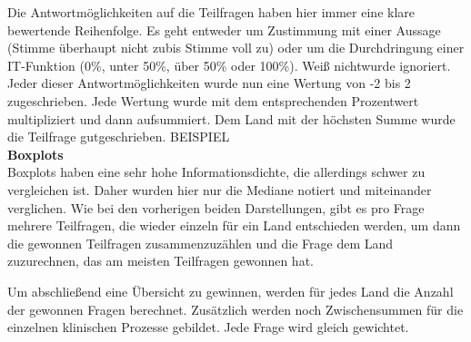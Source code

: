 	Die Antwortmöglichkeiten auf die Teilfragen haben hier immer eine klare bewertende Reihenfolge. Es geht entweder um Zustimmung mit einer Aussage (\glqq Stimme überhaupt nicht zu\grqq{ }bis \glqq Stimme voll zu\grqq) oder um die Durchdringung einer IT-Funktion (0\%, unter 50\%, über 50\% oder 100\%). \glqq Weiß nicht\grqq{ }wurde ignoriert. Jeder dieser Antwortmöglichkeiten wurde nun eine Wertung von -2 bis 2 zugeschrieben. Jede Wertung wurde mit dem entsprechenden Prozentwert multipliziert und dann aufsummiert. Dem Land mit der höchsten Summe wurde die Teilfrage gutgeschrieben.
	BEISPIEL
	\vspace{1ex}\\
	\textbf{Boxplots}\\
	Boxplots haben eine sehr hohe Informationsdichte, die allerdings schwer zu vergleichen ist. Daher wurden hier nur die Mediane notiert und miteinander verglichen. Wie bei den vorherigen beiden Darstellungen, gibt es pro Frage mehrere Teilfragen, die wieder einzeln für ein Land entschieden werden, um dann die gewonnen Teilfragen zusammenzuzählen und die Frage dem Land zuzurechnen, das am meisten Teilfragen gewonnen hat.

	Um abschließend eine Übersicht zu gewinnen, werden für jedes Land die Anzahl der gewonnen Fragen berechnet. Zusätzlich werden noch Zwischensummen für die einzelnen klinischen Prozesse gebildet. Jede Frage wird gleich gewichtet. 

